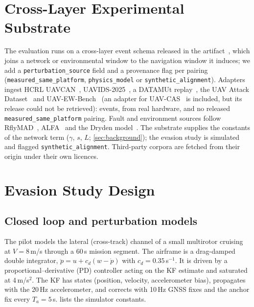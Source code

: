 \documentclass[letterpaper,twocolumn,10pt]{article}
\newcommand{\code}[1]{\texttt{#1}}
\theoremstyle{remark}
\begin{document}
\section{Cross-Layer Experimental Substrate}
\label{sec:benchmark}
The evaluation runs on a cross-layer event schema released in the
artifact~\cite{artifact}, which joins a network or environmental window to the
navigation window it induces; we add a \code{perturbation\_source} field and a
provenance flag per pairing (\code{measured\_same\_platform},
\code{physics\_model} or \code{synthetic\_alignment}). Adapters ingest HCRL
UAVCAN~\cite{kim2022uavcan}, UAVIDS-2025~\cite{zeng2025uavids}, a DATAMUt
replay~\cite{soltani2026datamut}, the UAV Attack
Dataset~\cite{whelan2020dataset,whelan2020novelty} and
UAV-EW-Bench~\cite{uavewbench2026} (an adapter for
UAV-CAS~\cite{mishra2026uavcas} is included, but its release could not be
retrieved): \nEventsTotal{} events, \nEventsReal{} from real hardware, and no
released \code{measured\_same\_platform} pairing. Fault and environment
sources follow RflyMAD~\cite{le2025rflymad}, ALFA~\cite{keipour2021alfa} and
the Dryden model~\cite{milf8785c}. The substrate supplies the constants of the
network term ($\gamma$, $s$, $L$; \cref{sec:background}); the evasion study is
simulated and flagged \code{synthetic\_alignment}. Third-party corpora are
fetched from their origin under their own licences.

\section{Evasion Study Design}
\label{sec:evasion}
\subsection{Closed loop and perturbation models}
The pilot models the lateral (cross-track) channel of a small multirotor
cruising at $V=8$\,m/s through a 60\,s mission segment. The airframe is a
drag-damped double integrator, $\ddot p=u+c_d(w-\dot p)$ with $c_d=0.35$\,s$^{-1}$.
It is driven by a proportional--derivative (PD) controller acting on the KF
estimate and saturated at 4\,m/s$^2$. The KF has states (position, velocity,
accelerometer bias), propagates with the 20\,Hz accelerometer, and corrects
with 10\,Hz GNSS fixes and the anchor fix every $T_a=5$\,s.
 lists the simulator constants.
\end{document}

